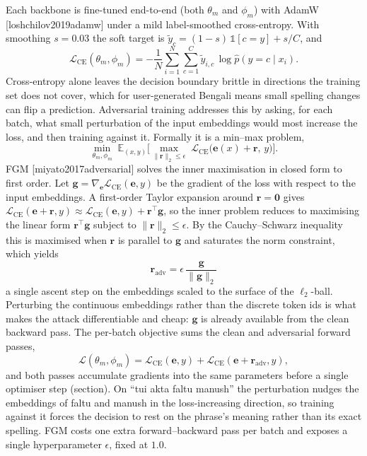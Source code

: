 \documentclass[11pt,a4paper]{article}
\def\citep#1{[#1]}%
\def\cref#1{section}%
\def\emph#1{#1}%
\begin{document}
Each backbone is fine-tuned end-to-end (both $\theta_m$ and $\phi_m$) with AdamW \citep{loshchilov2019adamw} under a mild label-smoothed cross-entropy. With smoothing $s = 0.03$ the soft target is $\tilde{y}_c = (1-s)\,\mathbb{1}[c = y] + s/C$, and
\begin{equation}
\mathcal{L}_{\mathrm{CE}}(\theta_m, \phi_m) = -\frac{1}{N}\sum_{i=1}^{N}\sum_{c=1}^{C} \tilde{y}_{i,c}\,\log \hat{p}(y = c \mid x_i).
\label{eq:ce}
\end{equation}
Cross-entropy alone leaves the decision boundary brittle in directions the training set does not cover, which for user-generated Bengali means small spelling changes can flip a prediction. Adversarial training addresses this by asking, for each batch, what small perturbation of the input embeddings would most increase the loss, and then training against it. Formally it is a min--max problem,
\begin{equation}
\min_{\theta_m, \phi_m}\; \mathbb{E}_{(x,y)}\Big[\max_{\|\mathbf{r}\|_2 \le \epsilon}\; \mathcal{L}_{\mathrm{CE}}\big(\mathbf{e}(x) + \mathbf{r},\, y\big)\Big].
\label{eq:minmax}
\end{equation}
FGM \citep{miyato2017adversarial} solves the inner maximisation in closed form to first order. Let $\mathbf{g} = \nabla_{\mathbf{e}}\mathcal{L}_{\mathrm{CE}}(\mathbf{e},y)$ be the gradient of the loss with respect to the input embeddings. A first-order Taylor expansion around $\mathbf{r} = \mathbf{0}$ gives $\mathcal{L}_{\mathrm{CE}}(\mathbf{e} + \mathbf{r}, y) \approx \mathcal{L}_{\mathrm{CE}}(\mathbf{e}, y) + \mathbf{r}^{\top}\mathbf{g}$, so the inner problem reduces to maximising the linear form $\mathbf{r}^{\top}\mathbf{g}$ subject to $\|\mathbf{r}\|_2 \le \epsilon$. By the Cauchy--Schwarz inequality this is maximised when $\mathbf{r}$ is parallel to $\mathbf{g}$ and saturates the norm constraint, which yields
\begin{equation}
\boxed{\;\mathbf{r}_{\mathrm{adv}} = \epsilon\,\frac{\mathbf{g}}{\|\mathbf{g}\|_2}\;}
\label{eq:fgm}
\end{equation}
a single ascent step on the embeddings scaled to the surface of the $\ell_2$-ball. Perturbing the continuous embeddings rather than the discrete token ids is what makes the attack differentiable and cheap: $\mathbf{g}$ is already available from the clean backward pass. The per-batch objective sums the clean and adversarial forward passes,
\begin{equation}
\mathcal{L}(\theta_m, \phi_m) = \mathcal{L}_{\mathrm{CE}}(\mathbf{e}, y) + \mathcal{L}_{\mathrm{CE}}(\mathbf{e} + \mathbf{r}_{\mathrm{adv}}, y),
\label{eq:fgm-loss}
\end{equation}
and both passes accumulate gradients into the same parameters before a single optimiser step (\cref{alg:fgm}). On \emph{``tui akta faltu manush''} the perturbation nudges the embeddings of \emph{faltu} and \emph{manush} in the loss-increasing direction, so training against it forces the decision to rest on the phrase's meaning rather than its exact spelling. FGM costs one extra forward--backward pass per batch and exposes a single hyperparameter $\epsilon$, fixed at $1.0$.
\end{document}
